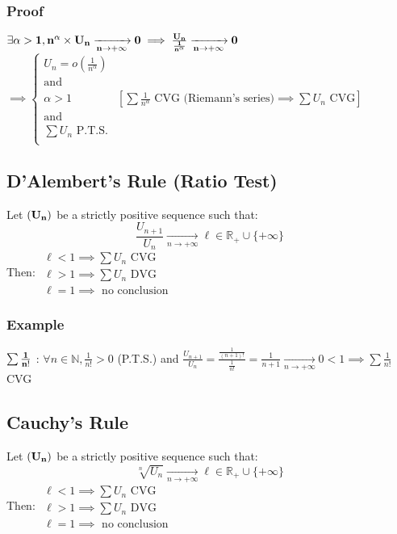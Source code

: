 \documentclass[notitlepage]{math}
\begin{document}
\subsubsection{Proof}
$\bf \exists \alpha > 1, n^\alpha \times U_n \xrightarrow[n \to +\infty]{} 0 \implies \frac{U_n}{\frac{1}{n^\alpha}} \xrightarrow[n \to +\infty]{} 0$\\
$\implies \left\{ \begin{array}{r|r}
    U_n = o(\frac{1}{n^\alpha}) &\\
    \text{and } &\\ 
    \alpha > 1 & \left[ \sum \frac{1}{n^\alpha} \text{ CVG (Riemann's series)} \implies \sum U_n \text{ CVG} \right]\\
    \text{and } &\\
    \sum U_n \text{ P.T.S.}& \\
\end{array} \right. $
\subsection{D'Alembert's Rule (Ratio Test)}
Let $\bf (U_n)$ be a strictly positive sequence such that:
\[ \frac{U_{n+1}}{U_n} \xrightarrow[n \to +\infty]{} \ell \in \mathbb{R}_+\cup \{+\infty\} \]
Then:
$\begin{array}{l}
    \ell < 1 \implies \sum U_n \text{ CVG}\\
    \ell > 1 \implies \sum U_n \text{ DVG}\\
    \ell = 1 \implies \text{ no conclusion}    
\end{array}$
\subsubsection{Example}
$\bf \sum \frac{1}{n!}$ : $\forall n \in \mathbb{N}, \frac{1}{n!} > 0$ (P.T.S.) and $\frac{U_{n+1}}{U_n} = \frac{\frac{1}{(n+1)!}}{\frac{1}{n!}} = \frac{1}{n+1} \xrightarrow[n \to +\infty]{} 0 < 1 \implies \sum \frac{1}{n!}$ CVG\\

\subsection{Cauchy's Rule}
Let $\bf (U_n)$ be a strictly positive sequence such that:
\[ \sqrt[n]{U_n} \xrightarrow[n \to +\infty]{} \ell \in \mathbb{R}_+\cup \{+\infty\} \]
Then:
$\begin{array}{l}
    \ell < 1 \implies \sum U_n \text{ CVG}\\
    \ell > 1 \implies \sum U_n \text{ DVG}\\
    \ell = 1 \implies \text{ no conclusion}
\end{array}$
\end{document}
